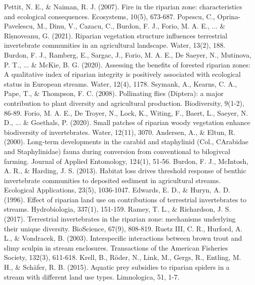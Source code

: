 \documentclass[12pt]{article}
\numberwithin{equation}{section}
\begin{document}
\begin{thebibliography}{99}
  Pettit, N. E., \& Naiman, R. J. (2007). Fire in the riparian zone: characteristics and ecological consequences. Ecosystems, 10(5), 673-687.
  Popescu, C., Oprina-Pavelescu, M., Dinu, V., Cazacu, C., Burdon, F. J., Forio, M. A. E., ... \& Rîșnoveanu, G. (2021). Riparian vegetation structure influences terrestrial invertebrate communities in an agricultural landscape. Water, 13(2), 188.
  Burdon, F. J., Ramberg, E., Sargac, J., Forio, M. A. E., De Saeyer, N., Mutinova, P. T., ... \& McKie, B. G. (2020). Assessing the benefits of forested riparian zones: A qualitative index of riparian integrity is positively associated with ecological status in European streams. Water, 12(4), 1178.
  Ssymank, A., Kearns, C. A., Pape, T., \& Thompson, F. C. (2008). Pollinating flies (Diptera): a major contribution to plant diversity and agricultural production. Biodiversity, 9(1-2), 86-89.
  Forio, M. A. E., De Troyer, N., Lock, K., Witing, F., Baert, L., Saeyer, N. D., ... \& Goethals, P. (2020). Small patches of riparian woody vegetation enhance biodiversity of invertebrates. Water, 12(11), 3070.
  Andersen, A., \& Eltun, R. (2000). Long‐term developments in the carabid and staphylinid (Col., CArabidae and Staphylinidae) fauna during conversion from conventional to bilogivcal farming. Journal of Applied Entomology, 124(1), 51-56.
  Burdon, F. J., McIntosh, A. R., \& Harding, J. S. (2013). Habitat loss drives threshold response of benthic invertebrate communities to deposited sediment in agricultural streams. Ecological Applications, 23(5), 1036-1047.
  Edwards, E. D., \& Huryn, A. D. (1996). Effect of riparian land use on contributions of terrestrial invertebrates to streams. Hydrobiologia, 337(1), 151-159.
  Ramey, T. L., \& Richardson, J. S. (2017). Terrestrial invertebrates in the riparian zone: mechanisms underlying their unique diversity. BioScience, 67(9), 808-819.
  Ruetz III, C. R., Hurford, A. L., \& Vondracek, B. (2003). Interspecific interactions between brown trout and slimy sculpin in stream enclosures. Transactions of the American Fisheries Society, 132(3), 611-618.
  Krell, B., Röder, N., Link, M., Gergs, R., Entling, M. H., \& Schäfer, R. B. (2015). Aquatic prey subsidies to riparian spiders in a stream with different land use types. Limnologica, 51, 1-7.

\end{thebibliography}
\end{document}
